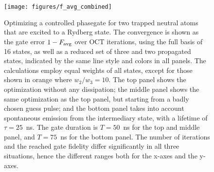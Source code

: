\begin{figure}[tb] %
  \centering
 \texttt{[image: figures/f\_avg\_combined]}
 \caption[Optimizing a controlled phasegate for two trapped neutral
   atoms that are excited to a Rydberg state.]{Optimizing a controlled phasegate for two trapped neutral
   atoms that are excited to a Rydberg state. The convergence is shown
   as the gate error $1-F_{\operatorname{avg}}$ over OCT iterations, using  the full basis of
   16 states, as well as a reduced set of three and two propagated states,
   indicated by the same line style and colors in all panels.  The
   calculations employ equal weights of all states, except for those shown in
   orange where $w_2 / w_3 = 10$.  The top panel shows the optimization without
   any dissipation; the middle panel shows the same optimization as the top
   panel, but starting from a badly chosen guess pulse; and the bottom panel
   takes into account spontaneous emission from the intermediary state, with
   a lifetime of $\tau = 25$~ns. The gate duration is $T=50$~ns for the top and
   middle panel, and $T=75$~ns for the bottom panel. The number of iterations
   and the reached gate fidelity differ significantly in all three situations,
   hence the different ranges both for the x-axes and the y-axes.}
  \label{fig:converg:Rydberg}
\end{figure}

